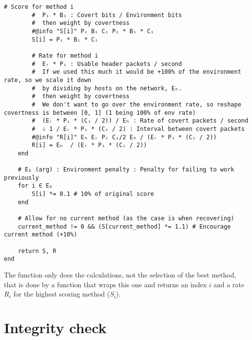 \begin{lstlisting}[language=JuliaLocal, style=julia]
        # Score for method i
        #  Pᵢ * Bᵢ : Covert bits / Environment bits
        #  then weight by covertness
        #@info "S[i]" Pᵢ Bᵢ Cᵢ Pᵢ * Bᵢ * Cᵢ
        S[i] = Pᵢ * Bᵢ * Cᵢ

        # Rate for method i
        #  Eᵣ * Pᵢ : Usable header packets / second
        #  If we used this much it would be +100% of the environment rate, so we scale it down
        #  by dividing by hosts on the network, Eₕ.
        #  then weight by covertness
        #  We don't want to go over the environment rate, so reshape covertness is between [0, 1] (1 being 100% of env rate)
        #  (Eᵣ * Pᵢ * (Cᵢ / 2)) / Eₕ : Rate of covert packets / second
        #  ∴ 1 / Eᵣ * Pᵢ * (Cᵢ / 2) : Interval between covert packets
        #@info "R[i]" Eₕ Eᵣ Pᵢ Cᵢ/2 Eₕ / (Eᵣ * Pᵢ * (Cᵢ / 2))
        R[i] = Eₕ  / (Eᵣ * Pᵢ * (Cᵢ / 2)) 
    end

    # Eₚ (arg) : Environment penalty : Penalty for failing to work previously
    for i ∈ Eₚ
        S[i] *= 0.1 # 10% of original score
    end

    # Allow for no current method (as the case is when recovering)
    current_method != 0 && (S[current_method] *= 1.1) # Encourage current method (+10%)

    return S, R
end
\end{lstlisting}

The  function only does the calculations, not the selection of the best method, that is done by a function that wraps this one and returns an index $i$ and a rate $R_i$ for the highest scoring method ($S_i$).

\section{Integrity check}

